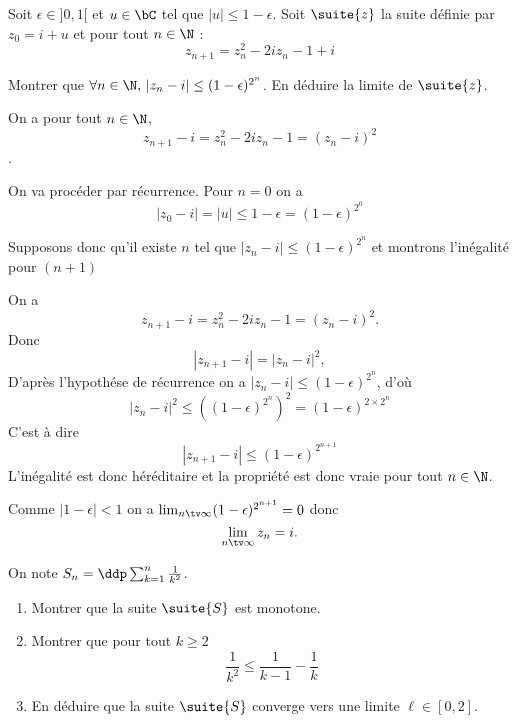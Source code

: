 \documentclass[a4paper, 11pt,reqno]{article}
\begin{document}
\begin{exercice}
Soit $\epsilon\in]0,1[$ et $u\in \bC$ tel que $|u| \leq 1-\epsilon$.
Soit $\suite{z}$ la suite définie par $z_0= i+u$ et pour tout $n\in \N$ :
$$z_{n+1} = z_n^2 -2iz_n-1+i$$

Montrer que $\forall n\in \N,\, |z_n-i|\leq (1-\epsilon)^{2^n}$. En déduire la limite de $\suite{z}$.
\end{exercice}

\begin{correction}
On a pour tout $n\in \N$, 
$$z_{n+1} -i =z_n^2 -2iz_n-1= (z_n-i)^2$$. 

On va procéder par récurrence. Pour $n=0$ on a 
$$|z_0-i |=|u| \leq 1-\epsilon =(1-\epsilon)^{2^0}$$

Supposons donc qu'il existe $n$ tel que $|z_n-i|\leq (1-\epsilon)^{2^n}$  et montrons l'inégalité pour $(n+1)$


On a $$z_{n+1} - i = z_n^2-2iz_n-1 = (z_n -i)^2.$$
Donc 
$$|z_{n+1} - i | =| z_n -i|^2,$$
D'après l'hypothése de récurrence on a 
$| z_n -i| \leq (1-\epsilon)^{2^n}$, d'où
$$| z_n -i|^2 \leq \left((1-\epsilon)^{2^n}\right)^2 =(1-\epsilon)^{2\times 2^{n}}$$
C'est à dire 
$$|z_{n+1} - i | \leq (1-\epsilon)^{2^{n+1}}$$
L'inégalité est donc héréditaire et la propriété est donc vraie pour tout $n\in \N$.

Comme $|1-\epsilon|<1$ on a $\lim_{n\tv \infty}  (1-\epsilon)^{2^{n+1}}=0$ donc 
$$\lim_{n\tv \infty}  z_n = i.$$




\end{correction}




\begin{exercice}
On note $S_n=  \ddp \sum_{k=1}^n \frac{1}{k^2}$.

\begin{enumerate}
\item Montrer que la suite $\suite{S}$  est monotone. 
\item Montrer que pour tout $k\geq 2$
$$\frac{1}{k^2} \leq \frac{1}{k-1}-\frac{1}{k}$$
\item En déduire que la suite $\suite{S}$ converge vers une limite $\ell \in [0,2]$. 
\end{enumerate}
\end{exercice}
\end{document}
